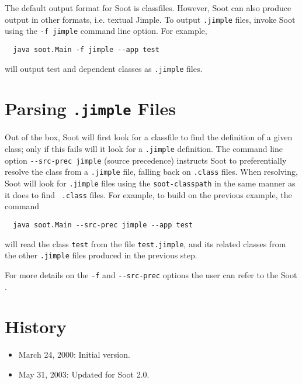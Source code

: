 \documentclass[11pt]{article}
\begin{document}
The default output format for Soot is classfiles. However, Soot can
also produce output in other formats, i.e. textual Jimple. To output
{\tt .jimple} files, invoke Soot using the {\tt -f jimple} command line
option. For example,

\begin{verbatim}
  java soot.Main -f jimple --app test
\end{verbatim}

will output test and dependent classes as {\tt .jimple} files.

\section{Parsing {\tt .jimple} Files}

Out of the box, Soot will first look for a classfile to find the
definition of a given class; only if this fails will it look for a
{\tt .jimple} definition. The command line option {\tt -}{\tt -src-prec
jimple} (source precedence) instructs Soot to preferentially resolve
the class from a {\tt .jimple} file, falling back on {\tt .class}
files.  When resolving, Soot will look for {\tt .jimple} files using
the {\tt soot-classpath} in the same manner as it does to find {\tt
.class} files. For example, to build on the previous example, the
command

\begin{verbatim}
  java soot.Main --src-prec jimple --app test
\end{verbatim}

will read the class {\tt test} from the file {\tt test.jimple}, and its
related classes from the other {\tt .jimple} files produced in the previous
step.

For more details on the {\tt -f} and {\tt -}{\tt -src-prec} options
the user can refer to the Soot .

\section*{History}
\begin{itemize}
\item March 24, 2000: Initial version.
\item May 31, 2003: Updated for Soot 2.0.
\end{itemize}
\end{document}
